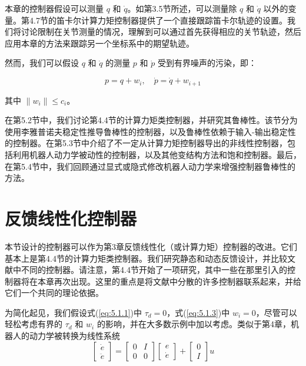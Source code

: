 \documentclass[UTF8,12pt,a4paper]{ctexart}
\begin{document}
本章的控制器假设可以测量 $q$ 和 $\dot{q}$。如第3.5节所述，可以测量除 $q$ 和 $\dot{q}$ 以外的变量。第4.7节的笛卡尔计算力矩控制器提供了一个直接跟踪笛卡尔轨迹的设置。我们将讨论限制在关节测量的情况，理解到可以通过首先获得相应的关节轨迹，然后应用本章的方法来跟踪另一个坐标系中的期望轨迹。

然而，我们可以假设 $q$ 和 $\dot{q}$ 的测量 $p$ 和 $\dot{p}$ 受到有界噪声的污染，即：

\begin{equation}\label{eq:5.1.3}
p = q + w_i, \quad \dot{p} = \dot{q} + w_{i+1}
\end{equation}

其中 $\|w_i\| \leq c_i$。

在第5.2节中，我们讨论第4.4节的计算力矩类控制器，并研究其鲁棒性。该节分为使用李雅普诺夫稳定性推导鲁棒性的控制器，以及鲁棒性依赖于输入-输出稳定性的控制器。在第5.3节中介绍了不一定从计算力矩控制器导出的非线性控制器，包括利用机器人动力学被动性的控制器，以及其他变结构方法和饱和控制器。最后，在第5.4节中，我们回顾通过显式或隐式修改机器人动力学来增强控制器鲁棒性的方法。

\section{反馈线性化控制器}

本节设计的控制器可以作为第3章反馈线性化（或计算力矩）控制器的改进。它们基本上是第4.4节的计算力矩类控制器。我们研究静态和动态反馈设计，并比较文献中不同的控制器。请注意，第4.4节开始了一项研究，其中一些在那里引入的控制器将在本章再次出现。这里的重点是将文献中分散的许多控制器联系起来，并给它们一个共同的理论依据。

为简化起见，我们假设式(\ref{eq:5.1.1})中 $\tau_d = 0$，式(\ref{eq:5.1.3})中 $w_i = 0$，尽管可以轻松考虑有界的 $\tau_d$ 和 $w_i$ 的影响，并在大多数示例中加以考虑。类似于第4章，机器人的动力学被转换为线性系统
\begin{equation*}
\begin{bmatrix} \dot{e} \\ \ddot{e} \end{bmatrix} = \begin{bmatrix} 0 & I \\ 0 & 0 \end{bmatrix} \begin{bmatrix} e \\ \dot{e} \end{bmatrix} + \begin{bmatrix} 0 \\ I \end{bmatrix} u
\end{equation*}
\end{document}
